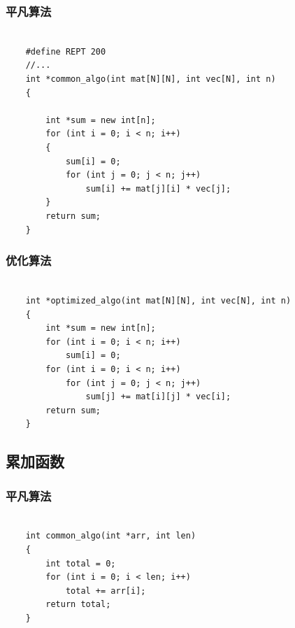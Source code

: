 \documentclass[a4paper]{article}
\begin{document}
\subsubsection{平凡算法}
\begin{verbatim}

    #define REPT 200
    //...
    int *common_algo(int mat[N][N], int vec[N], int n)
    {
    
        int *sum = new int[n];
        for (int i = 0; i < n; i++)
        {
            sum[i] = 0;
            for (int j = 0; j < n; j++)
                sum[i] += mat[j][i] * vec[j];
        }
        return sum;
    }
\end{verbatim}

\subsubsection{优化算法}
\begin{verbatim}

    int *optimized_algo(int mat[N][N], int vec[N], int n)
    {
        int *sum = new int[n];
        for (int i = 0; i < n; i++)
            sum[i] = 0;
        for (int i = 0; i < n; i++)
            for (int j = 0; j < n; j++)
                sum[j] += mat[i][j] * vec[i];
        return sum;
    }
\end{verbatim}

\subsection{累加函数}
\subsubsection{平凡算法}
\begin{verbatim}

    int common_algo(int *arr, int len)
    {
        int total = 0;
        for (int i = 0; i < len; i++)
            total += arr[i];
        return total;
    }
\end{verbatim}
\end{document}
